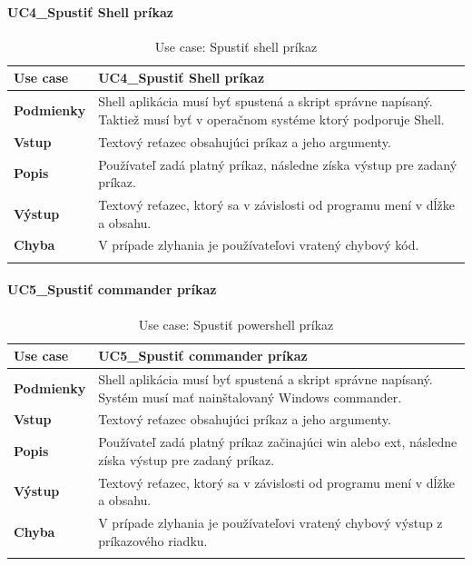 \paragraph{UC4\_Spustiť Shell príkaz}
\begin{center}
	\begin{longtable}{|p{2.5cm}|p{12.2cm}|}

			\hline
			\textbf{Use case} & UC4\_Spustiť Shell príkaz \\ 
			\hline
			\textbf{Podmienky} & Shell aplikácia musí byť spustená a skript správne napísaný. Taktiež musí byť v operačnom systéme ktorý podporuje Shell. \\ 
			\hline
			\textbf{Vstup} & Textový reťazec obsahujúci príkaz a jeho argumenty.\\
			\hline
			\textbf{Popis} & Používateľ zadá platný príkaz, následne získa výstup pre zadaný príkaz. \\ 
			\hline
			\textbf{Výstup} &Textový reťazec, ktorý sa v závislosti od programu mení v dĺžke a obsahu. \\
			\hline
			\textbf{Chyba} & V prípade zlyhania je používateľovi vratený chybový kód.\\
			\hline
		\caption{Use case: Spustiť shell príkaz}
	\label{table:1}
	
	\end{longtable}
\end{center}

\paragraph{UC5\_Spustiť commander príkaz}
\begin{center}
	\begin{longtable}{|p{2.5cm}|p{12.2cm}|}

			\hline
			\textbf{Use case} & UC5\_Spustiť commander príkaz \\ 
			\hline
			\textbf{Podmienky} & Shell aplikácia musí byť spustená a skript správne napísaný. Systém musí mať nainštalovaný Windows commander.\\ 
			\hline
			\textbf{Vstup} & Textový reťazec obsahujúci príkaz a jeho argumenty.\\
			\hline
			\textbf{Popis} & Používateľ zadá platný príkaz začinajúci win alebo ext, následne získa výstup pre zadaný príkaz. \\ 
			\hline
			\textbf{Výstup} &Textový reťazec, ktorý sa v závislosti od programu mení v dĺžke a obsahu. \\
			\hline
			\textbf{Chyba} & V prípade zlyhania je používateľovi vratený chybový výstup z príkazového riadku.\\
			\hline
	\caption{Use case: Spustiť powershell príkaz}
	\label{table:1}

	\end{longtable}
\end{center}
